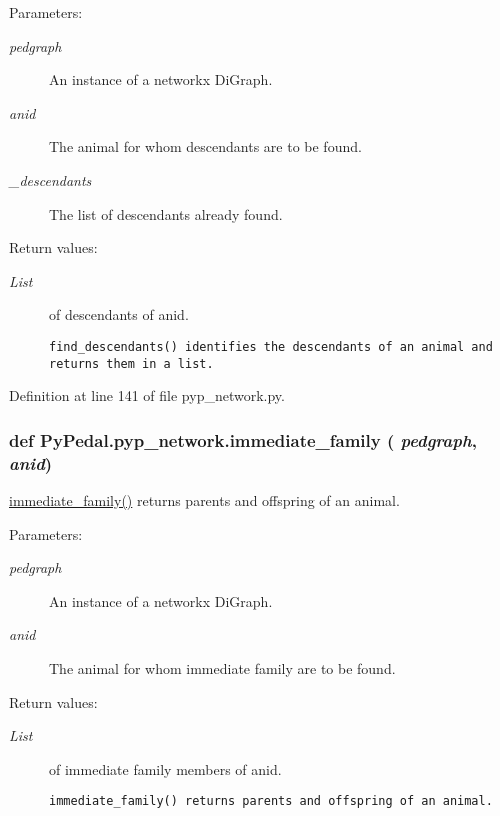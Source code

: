 \begin{Desc}
\item[Parameters:]
\begin{description}
\item[{\em pedgraph}]An instance of a networkx Di\-Graph. \item[{\em anid}]The animal for whom descendants are to be found. \item[{\em \_\-descendants}]The list of descendants already found. \end{description}
\end{Desc}
\begin{Desc}
\item[Return values:]
\begin{description}
\item[{\em List}]of descendants of anid.

\footnotesize\begin{verbatim}find_descendants() identifies the descendants of an animal and returns them in a list.
\end{verbatim}
\normalsize
 \end{description}
\end{Desc}


Definition at line 141 of file pyp\_\-network.py.\hypertarget{namespacePyPedal_1_1pyp__network_3f216a5694155a42ef0662e0300d71da}{
\subsubsection[immediate\_\-family]{\setlength{\rightskip}{0pt plus 5cm}def Py\-Pedal.pyp\_\-network.immediate\_\-family ( {\em pedgraph},  {\em anid})}}
\label{namespacePyPedal_1_1pyp__network_3f216a5694155a42ef0662e0300d71da}


\hyperlink{namespacePyPedal_1_1pyp__network_3f216a5694155a42ef0662e0300d71da}{immediate\_\-family()} returns parents and offspring of an animal. 

\begin{Desc}
\item[Parameters:]
\begin{description}
\item[{\em pedgraph}]An instance of a networkx Di\-Graph. \item[{\em anid}]The animal for whom immediate family are to be found. \end{description}
\end{Desc}
\begin{Desc}
\item[Return values:]
\begin{description}
\item[{\em List}]of immediate family members of anid.

\footnotesize\begin{verbatim}immediate_family() returns parents and offspring of an animal.
\end{verbatim}
\normalsize
 \end{description}
\end{Desc}


